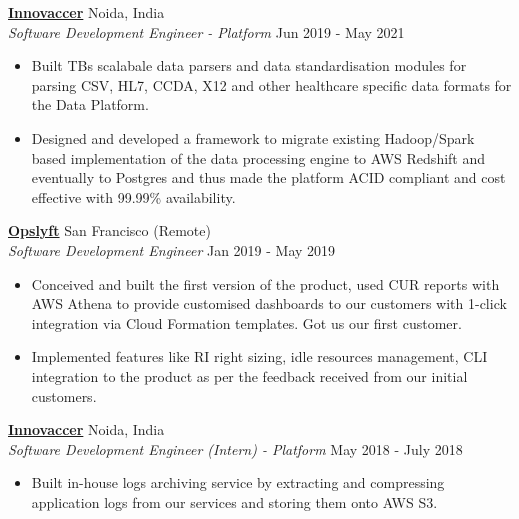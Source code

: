 \documentclass[a4paper]{article}
\begin{document}
\textbf{\href{https://innovaccer.com/}{Innovaccer}} \hfill Noida, India\\
\textit{Software Development Engineer - Platform} \hfill Jun 2019 - May 2021\\
\vspace{-1mm}
\begin{itemize} \itemsep 0.5pt
	\item Built TBs scalabale data parsers and data standardisation modules for parsing CSV, HL7, CCDA, X12 and other healthcare specific data formats for the Data Platform.
	\item Designed and developed a framework to migrate existing Hadoop/Spark based implementation of the data processing engine to AWS Redshift and eventually to Postgres and thus made the platform ACID compliant and cost effective with 99.99\% availability.
\end{itemize}
\textbf{\href{https://opslyft.com/}{Opslyft}} \hfill San Francisco (Remote)\\
\textit{Software Development Engineer} \hfill Jan 2019 - May 2019\\
\vspace{-1mm}
\begin{itemize} \itemsep 0.5pt
	\item Conceived and built the first version of the product, used CUR reports with AWS Athena to provide customised dashboards to our customers with 1-click integration via Cloud Formation templates. Got us our first customer.
	\item Implemented features like RI right sizing, idle resources management, CLI integration to the product as per the feedback received from our initial customers.
\end{itemize}
\textbf{\href{https://innovaccer.com/}{Innovaccer}} \hfill Noida, India\\
\textit{Software Development Engineer (Intern) - Platform} \hfill May 2018 - July 2018\\
\vspace{-1mm}
\begin{itemize} \itemsep 0.5pt
	\item Built in-house logs archiving service by extracting and compressing application logs from our services and storing them onto AWS S3.
\end{itemize}
\end{document}
